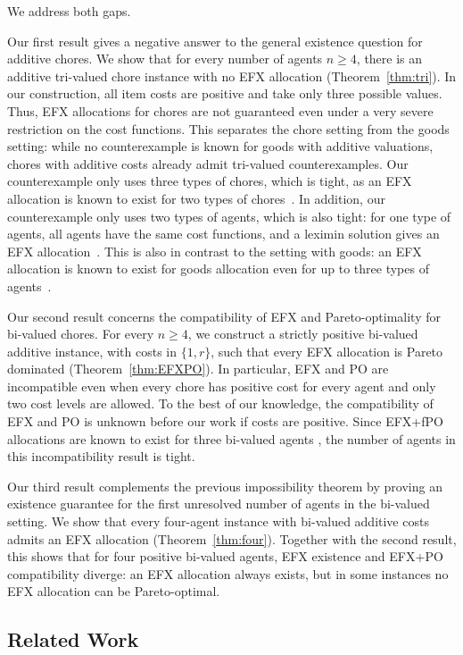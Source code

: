 \documentclass{article}
\theoremstyle{definition}
\begin{document}
We address both gaps.

Our first result gives a negative answer to the general existence question for
additive chores.  We show that for every number of agents $n\geq 4$, there is an
additive tri-valued chore instance with no EFX allocation (Theorem~\ref{thm:tri}).  In our construction,
all item costs are positive and take only three possible values.  Thus, EFX
allocations for chores are not guaranteed even under a very severe restriction on
the cost functions.  This separates the chore setting from the goods setting:
while no counterexample is known for goods with additive valuations, chores with additive costs already
admit tri-valued counterexamples.
Our counterexample only uses three types of chores, which is tight, as an EFX allocation is known to exist for two types of chores~\citep{aziz2023fair}.
In addition, our counterexample only uses two types of agents, which is also tight: for one type of agents, all agents have the same cost functions, and a leximin solution gives an EFX allocation~\citep{plaut2020almost,chen2020fairness}.
This is also in contrast to the setting with goods: an EFX allocation is known to exist for goods allocation even for up to three types of agents~\citep{hv2025efx}.

Our second result concerns the compatibility of EFX and Pareto-optimality for
bi-valued chores.  For every $n\geq 4$, we construct a strictly positive
bi-valued additive instance, with costs in $\{1,r\}$, such that every EFX
allocation is Pareto dominated (Theorem~\ref{thm:EFXPO}).
In particular, EFX and PO are incompatible even
when every chore has positive cost for every agent and only two cost levels are
allowed.
To the best of our knowledge, the compatibility of EFX and PO is unknown before our work if costs are positive.
Since EFX+fPO allocations are known to exist for three bi-valued agents
\citep{garg2023new}, the number of agents in this incompatibility result is
tight.

Our third result complements the previous impossibility theorem by proving an
existence guarantee for the first unresolved number of agents in the bi-valued
setting. 
We show that every four-agent instance with bi-valued additive costs
admits an EFX allocation (Theorem~\ref{thm:four}).  
Together with the second result, this shows that for
four positive bi-valued agents, EFX existence and EFX+PO compatibility diverge:
an EFX allocation always exists, but in some instances no EFX allocation can be
Pareto-optimal.

\subsection{Related Work}
\label{subsec:related-work}
\end{document}
